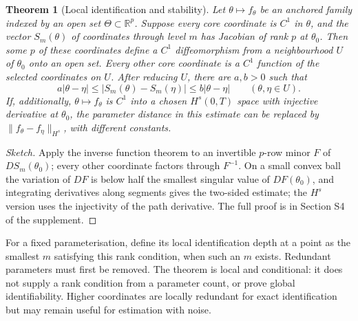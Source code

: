 \documentclass[11pt,english]{article}
\newtheorem{theorem}{Theorem}
\theoremstyle{definition}
\theoremstyle{remark}
\begin{document}
\begin{theorem}[Local identification and stability]
\label{thm:localdepth}
Let $\theta\mapsto f_\theta$ be an anchored family indexed by an open
set $\Theta\subset\mathbb R^p$. Suppose every core coordinate is
$C^1$ in $\theta$, and the vector $S_m(\theta)$ of coordinates
through level $m$ has Jacobian of rank $p$ at $\theta_0$.
Then some $p$ of these coordinates define a $C^1$ diffeomorphism
from a neighbourhood $U$ of $\theta_0$ onto an open set. Every other
core coordinate is a $C^1$ function of the selected coordinates on
$U$. After reducing $U$, there are $a,b>0$ such that
\[
a|\theta-\eta|\le |S_m(\theta)-S_m(\eta)|
\le b|\theta-\eta|\qquad(\theta,\eta\in U).
\]
If, additionally, $\theta\mapsto f_\theta$ is $C^1$ into a chosen
$H^s(0,T)$ space with injective derivative at $\theta_0$, the
parameter distance in this estimate can be replaced by
$\|f_\theta-f_\eta\|_{H^s}$, with different constants.
\end{theorem}

\begin{proof}[Sketch]
Apply the inverse function theorem to an invertible $p$-row minor $F$
of $DS_{m}(\theta_{0})$; every other coordinate factors through
$F^{-1}$. On a small convex ball the variation of $DF$ is below half
the smallest singular value of $DF(\theta_{0})$, and integrating
derivatives along segments gives the two-sided estimate; the $H^{s}$
version uses the injectivity of the path derivative. The full proof
is in Section S4 of the supplement.
\end{proof}

For a fixed parameterisation, define its local identification depth
at a point as the smallest $m$ satisfying this rank condition, when
such an $m$ exists. Redundant parameters must first be removed. The
theorem is local and conditional: it does not supply a rank condition
from a parameter count, or prove global identifiability. Higher
coordinates are locally redundant for exact identification but may
remain useful for estimation with noise.
\end{document}
